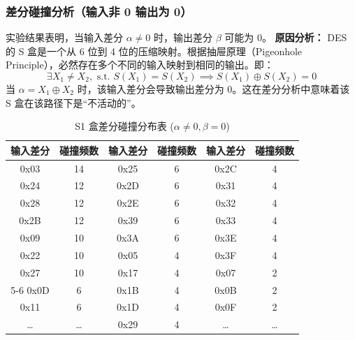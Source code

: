 \subsubsection{差分碰撞分析（输入非 0 输出为 0）}
实验结果表明，当输入差分 $\alpha \neq 0$ 时，输出差分 $\beta$ 可能为 0。
\textbf{原因分析：}
DES 的 S 盒是一个从 6 位到 4 位的压缩映射。根据抽屉原理（Pigeonhole Principle），必然存在多个不同的输入映射到相同的输出。即：
$$ \exists X_1 \neq X_2, \text{ s.t. } S(X_1) = S(X_2) \implies S(X_1) \oplus S(X_2) = 0 $$
当 $\alpha = X_1 \oplus X_2$ 时，该输入差分会导致输出差分为 0。这在差分分析中意味着该 S 盒在该路径下是“不活动的”。
\begin{table}[H]
\centering
\caption{S1 盒差分碰撞分布表 ($\alpha \neq 0, \beta = 0$)}
\begin{small}
\begin{tabular}{|cc|cc|cc|}
\hline
\textbf{输入差分} & \textbf{碰撞频数} & \textbf{输入差分} & \textbf{碰撞频数} & \textbf{输入差分} & \textbf{碰撞频数} \\ \hline
0x03 & 14 & 0x25 & 6  & 0x2C & 4  \\
0x24 & 12 & 0x2D & 6  & 0x31 & 4  \\
0x28 & 12 & 0x2E & 6  & 0x32 & 4  \\
0x2B & 12 & 0x39 & 6  & 0x33 & 4  \\
0x09 & 10 & 0x3A & 6  & 0x3E & 4  \\
0x22 & 10 & 0x05 & 4  & 0x3F & 4  \\
0x27 & 10 & 0x17 & 4  & 0x07 & 2  \\ \cline{5-6} 
0x0D & 6  & 0x1B & 4  & 0x0B & 2  \\
0x11 & 6  & 0x1D & 4  & 0x0F & 2  \\
\dots & \dots & 0x29 & 4  & \dots & \dots \\ \hline
\end{tabular}
\end{small}
\end{table}